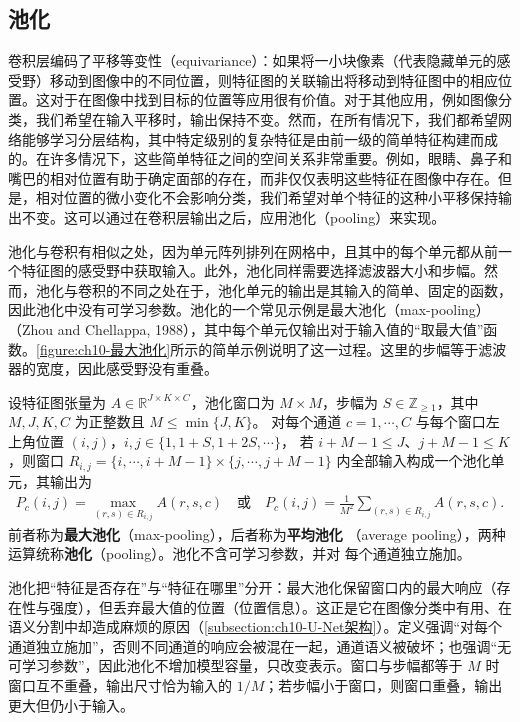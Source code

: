 \documentclass[../../main.tex]{subfiles}
\begin{document}
\subsection{池化}\label{subsection:ch10-池化}

卷积层编码了平移等变性（equivariance）：如果将一小块像素（代表隐藏单元的感受野）移动到图像中的不同位置，则特征图的关联输出将移动到特征图中的相应位置。这对于在图像中找到目标的位置等应用很有价值。对于其他应用，例如图像分类，我们希望在输入平移时，输出保持不变。然而，在所有情况下，我们都希望网络能够学习分层结构，其中特定级别的复杂特征是由前一级的简单特征构建而成的。在许多情况下，这些简单特征之间的空间关系非常重要。例如，眼睛、鼻子和嘴巴的相对位置有助于确定面部的存在，而非仅仅表明这些特征在图像中存在。但是，相对位置的微小变化不会影响分类，我们希望对单个特征的这种小平移保持输出不变。这可以通过在卷积层输出之后，应用池化（pooling）来实现。

池化与卷积有相似之处，因为单元阵列排列在网格中，且其中的每个单元都从前一个特征图的感受野中获取输入。此外，池化同样需要选择滤波器大小和步幅。然而，池化与卷积的不同之处在于，池化单元的输出是其输入的简单、固定的函数，因此池化中没有可学习参数。池化的一个常见示例是最大池化（max-pooling）（Zhou and Chellappa, 1988），其中每个单元仅输出对于输入值的“取最大值”函数。\cref{figure:ch10-最大池化}所示的简单示例说明了这一过程。这里的步幅等于滤波器的宽度，因此感受野没有重叠。

\begin{definition}[池化、最大池化与平均池化]\label{definition:ch10-池化}
设特征图张量为 $A\in\mathbb{R}^{J\times K\times C}$，池化窗口为 $M\times M$，步幅为
$S\in\mathbb{Z}_{\geqslant1}$，其中 $M,J,K,C$ 为正整数且 $M\leqslant\min\{J,K\}$。
对每个通道 $c=1,\cdots,C$ 与每个窗口左上角位置 $(i,j)$，$i,j\in\{1,1+S,1+2S,\cdots\}$，
若 $i+M-1\leqslant J$、$j+M-1\leqslant K$，则窗口
$R_{i,j}=\{i,\cdots,i+M-1\}\times\{j,\cdots,j+M-1\}$ 内全部输入构成一个池化单元，其输出为
\begin{align*}
  P_c(i,j)=\max_{(r,s)\in R_{i,j}} A(r,s,c)
  \quad\text{或}\quad
  P_c(i,j)=\frac{1}{M^2}\sum_{(r,s)\in R_{i,j}} A(r,s,c).
\end{align*}
前者称为\textbf{最大池化}（max-pooling），后者称为\textbf{平均池化}
（average pooling），两种运算统称\textbf{池化}（pooling）。池化不含可学习参数，并对
每个通道独立施加。
\end{definition}

\begin{remark}
池化把“特征是否存在”与“特征在哪里”分开：最大池化保留窗口内的最大响应（存在性与强度），但丢弃最大值的位置（位置信息）。这正是它在图像分类中有用、在语义分割中却造成麻烦的原因（\cref{subsection:ch10-U-Net架构}）。定义强调“对每个通道独立施加”，否则不同通道的响应会被混在一起，通道语义被破坏；也强调“无可学习参数”，因此池化不增加模型容量，只改变表示。窗口与步幅都等于 $M$ 时窗口互不重叠，输出尺寸恰为输入的 $1/M$；若步幅小于窗口，则窗口重叠，输出更大但仍小于输入。
\end{remark}
\end{document}
